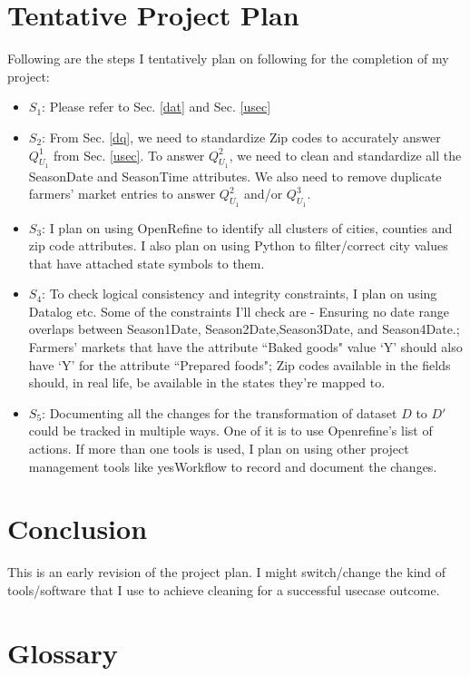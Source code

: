 \documentclass[10pt]{article}
\begin{document}
\section{Tentative Project Plan} \label{tpp}
Following are the steps I tentatively plan on following for the completion of my project:
\begin{itemize}
  \item $S_1$: Please refer to Sec. \ref{dat} and Sec. \ref{usec}
  \item $S_2$: From Sec. \ref{dq}, we need to standardize Zip codes to accurately answer $Q^{1}_{U_1}$ from Sec. \ref{usec}. To answer  $Q^{2}_{U_1}$, we need to clean and standardize all the SeasonDate and SeasonTime attributes. We also need to remove duplicate farmers' market entries to answer $Q^{2}_{U_1}$ and/or $Q^{3}_{U_1}$.
  \item $S_3$: I plan on using OpenRefine to identify all clusters of cities, counties and zip code attributes. I also plan on using Python to filter/correct city values that have attached state symbols to them. 
  \item $S_4$: To check logical consistency and integrity constraints, I plan on using Datalog etc. Some of the constraints I'll check are - Ensuring no date range overlaps between Season1Date, Season2Date,Season3Date, and Season4Date.; Farmers' markets that have the attribute ``Baked goods" value `Y' should also have `Y' for the attribute ``Prepared foods"; Zip codes available in the fields should, in real life, be available in the states they're mapped to.
 
  \item $S_5$: Documenting all the changes for the transformation of dataset $D$ to $D'$ could be tracked in multiple ways. One of it is to use Openrefine's list of actions. If more than one tools is used, I plan on using other project management tools like yesWorkflow to record and document the changes. 
\end{itemize}
\section{Conclusion}
This is an early revision of the project plan. I might switch/change the kind of tools/software that I use to achieve cleaning for a successful usecase outcome. 
\appendix
\section{Glossary}
\end{document}
